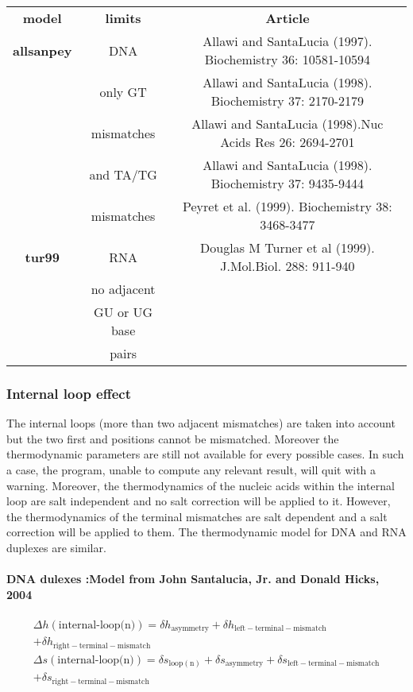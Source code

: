 \documentclass{article}
\begin{document}
\begin{table}[h]
\begin{tabular}[h]{| c | c | c |}
\textbf{model} & \textbf{limits} & \textbf{Article} \\
\textbf{allsanpey} & DNA & Allawi and SantaLucia (1997). Biochemistry 36: 10581-10594 \\
 & only GT  & Allawi and SantaLucia (1998). Biochemistry 37: 2170-2179 \\
 & mismatches & Allawi and SantaLucia (1998).Nuc Acids Res 26: 2694-2701 \\
 & and TA/TG & Allawi and SantaLucia (1998). Biochemistry 37: 9435-9444 \\
 & mismatches & Peyret et al. (1999). Biochemistry 38: 3468-3477\\
\textbf{tur99} & RNA & Douglas M Turner et al (1999). J.Mol.Biol.  288: 911-940 \\
 & no adjacent & \\
 & GU or UG base & \\
 &  pairs & \\
\end{tabular}
\end{table}

\subsubsection{Internal loop effect}

The internal loops (more than two adjacent mismatches) are taken into account but the two first and positions cannot
be mismatched. Moreover the thermodynamic parameters are still not available for every possible cases.
In such a case, the program, unable to compute any relevant result, will quit with a warning.
Moreover, the thermodynamics of the nucleic acids within the internal loop are salt 
independent and no salt correction will be applied to it. However, the thermodynamics
of the terminal mismatches are salt dependent and a salt correction will be applied
to them.
The thermodynamic model for DNA and RNA duplexes are similar.

\paragraph{DNA dulexes :\textbf{Model from John Santalucia, Jr. and Donald Hicks, 2004}} 

\begin{multline*}
\Delta h {(\mbox{internal-loop(n)})} =
\delta{}h_\mathrm{asymmetry} +
\delta{}h_\mathrm{left-terminal-mismatch} \\ +
\delta{}h_\mathrm{right-terminal-mismatch}\\
\Delta s {(\mbox{internal-loop(n)})} =
\delta{}s_\mathrm{loop(n)} +
\delta{}s_\mathrm{asymmetry} +
\delta{}s_\mathrm{left-terminal-mismatch} \\ +
\delta{}s_\mathrm{right-terminal-mismatch}\\
\end{multline*}
\end{document}

